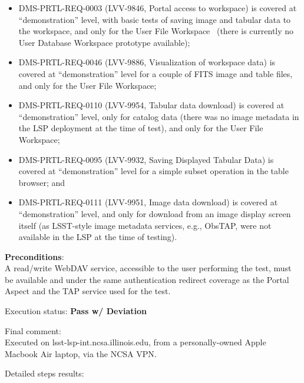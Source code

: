 \documentclass[DM,lsstdraft,STR,toc]{lsstdoc}
\providecommand{\tightlist}{
  \setlength{\itemsep}{0pt}\setlength{\parskip}{0pt}}
\begin{document}
\begin{itemize}
\tightlist
\item
  DMS-PRTL-REQ-0003 (LVV-9846, Portal access to workspace) is covered at
  ``demonstration'' level, with basic tests of saving image and tabular
  data to the workspace, and only for the User File Workspace ~(there is
  currently no User Database Workspace prototype available);
\item
  DMS-PRTL-REQ-0046 (LVV-9886, Visualization of workspace data) is
  covered at ``demonstration'' level for a couple of FITS image and
  table files, and only for the User File Workspace;
\item
  DMS-PRTL-REQ-0110 (LVV-9954, Tabular data download) is covered at
  ``demonstration'' level, only for catalog data (there was no image
  metadata in the LSP deployment at the time of test), and only for the
  User File Workspace;~
\item
  DMS-PRTL-REQ-0095 (LVV-9932, Saving Displayed Tabular Data) is covered
  at ``demonstration'' level for a simple subset operation in the table
  browser; and
\item
  DMS-PRTL-REQ-0111 (LVV-9951, Image data download) is covered at
  ``demonstration'' level, and only for download from an image display
  screen itself (as LSST-style image metadata services, e.g., ObsTAP,
  were not available in the LSP at the time of testing).
\end{itemize}

\textbf{ Preconditions}:\\
A read/write WebDAV service, accessible to the user performing the test,
must be available and under the same authentication redirect coverage as
the Portal Aspect and the TAP service used for the test.

Execution status: {\bf Pass w/ Deviation }

Final comment:\\Executed on lsst-lsp-int.ncsa.illinois.edu, from a personally-owned
Apple Macbook Air laptop, via the NCSA VPN.


Detailed steps results:
\end{document}
